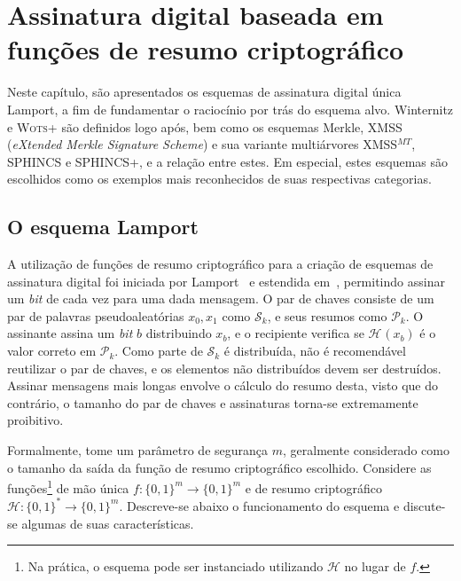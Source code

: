 \documentclass[12pt]{report}
\newcommand{\hh}{$\mathcal{H}$}
\newcommand{\pk}{$\mathcal{P}_k$}
\newcommand{\sk}{$\mathcal{S}_k$}
\newcommand{\hash}[2][]{\mathcal{H}^{#1}(#2)}
\newcommand{\binwds}[1]{\{0, 1\}^{#1}}
\begin{document}
\chapter{Assinatura digital baseada em funções de resumo criptográfico}

Neste capítulo, são apresentados os esquemas de assinatura digital única Lamport, a fim de fundamentar o raciocínio por trás do esquema alvo. Winternitz e \textsc{Wots+} são definidos logo após, bem como os esquemas Merkle, XMSS (\emph{eXtended Merkle Signature Scheme}) e sua variante multiárvores XMSS$^{MT}$, SPHINCS e SPHINCS+, e a relação entre estes. Em especial, estes esquemas são escolhidos como os exemplos mais reconhecidos de suas respectivas categorias.

\section{O esquema Lamport}

A utilização de funções de resumo criptográfico para a criação de 
esquemas de assinatura digital foi iniciada por 
Lamport~\cite{Lamport1979} e estendida 
em~\cite{Diffie:2006:NDC:2263321.2269104}, permitindo assinar um 
\emph{bit} de cada vez para uma dada mensagem. O par de chaves consiste 
de um par de palavras pseudoaleatórias $x_0, x_1$ como \sk{}, e seus 
resumos como \pk{}. O assinante assina um \emph{bit} $b$ distribuindo 
$x_b$, e o recipiente verifica se $\hash{x_b}$ é o
valor correto em \pk{}. Como parte de \sk{} é distribuída, não é
recomendável reutilizar o par de chaves, e os elementos não
distribuídos devem ser destruídos. Assinar mensagens mais longas
envolve o cálculo do resumo desta, visto que do contrário, o
tamanho do par de chaves e assinaturas torna-se extremamente
proibitivo.

Formalmente, tome um parâmetro de segurança $m$, geralmente considerado como
o tamanho da saída da função de resumo criptográfico escolhido. Considere as funções\footnote{Na prática, o esquema pode ser instanciado utilizando \hh{} no lugar de $f$.} de mão única
$f : \binwds{m} \longrightarrow \binwds{m}$
e de resumo criptográfico
$\mathcal{H} : \binwds{*} \longrightarrow \binwds{m}$.
Descreve-se abaixo o funcionamento do esquema
e discute-se algumas de suas características. 
\end{document}
